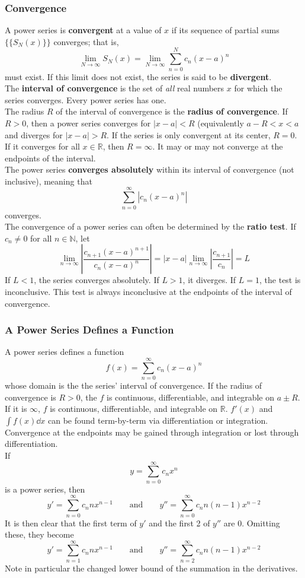 \documentclass[12pt, A4]{article}
\newcommand{\N}{\mathbb{N}}
\newcommand{\R}{\mathbb{R}}
\begin{document}
			\subsubsection{Convergence}
				A power series is \textbf{convergent} at a value of \(x\) if its sequence of partial sums \(\{\{S_N(x)\}\}\) converges; that is,
					\[\lim_{N \to \infty}S_N(x) = \lim_{N \to \infty}\sum_{n = 0}^Nc_n(x - a)^n\]
					must exist. If this limit does not exist, the series is said to be \textbf{divergent}. \\
				 The \textbf{interval of convergence} is the set of \textit{all} real numbers \(x\) for which the series converges. Every power series has one. \\
				 The radius \(R\) of the interval of convergence is the \textbf{radius of convergence}. If \(R > 0\), then a power series converges for \(|x - a| < R\) (equivalently \(a - R < x < a\)  and diverges for \(|x - a| > R\). If the series is only convergent at its center, \(R = 0\). If it converges for all \(x \in \R\), then \(R = \infty\). It may or may not converge at the endpoints of the interval. \\
				 The power series \textbf{converges absolutely} within its interval of convergence (not inclusive), meaning that
				 	\[\sum_{n = 0}^\infty\left|c_n(x - a)^n\right|\]
				 	converges. \\
				 The convergence of a power series can often be determined by the \textbf{ratio test}. If \(c_n \ne 0\) for all \(n \in \N\), let
				 	\[
				 		\lim_{n \to \infty}\left|\frac{c_{n + 1}(x - a)^{n + 1}}{c_n(x - a)^n}\right|
				 			= |x - a|\lim_{n \to \infty}\left|\frac{c_{n + 1}}{c_n}\right|
				 			= L
					\]
					If \(L < 1\), the series converges absolutely. If \(L > 1\), it diverges. If \(L = 1\), the test is inconclusive. This test is always inconclusive at the endpoints of the interval of convergence.
			\subsubsection{A Power Series Defines a Function}
				A power series defines a function
						\[f(x) = \sum_{n = 0}^\infty c_n(x - a)^n\]
						whose domain is the the series' interval of convergence. If the radius of convergence is \(R > 0\), the \(f\) is continuous, differentiable, and integrable on \(a \pm R\). If it is \(\infty\), \(f\) is continuous, differentiable, and integrable on \(\R\). \(f'(x)\) and \(\int f(x)\dd{x}\) can be found term-by-term via differentiation or integration. Convergence at the endpoints may be gained through integration or lost through differentiation. \\
					If
						\[y = \sum_{n = 0}^\infty c_nx^n\]
						is a power series, then
						\[
							y' = \sum_{n = 0}^\infty c_nnx^{n - 1} \qquad \text{and} \qquad
							y'' = \sum_{n = 0}^\infty c_nn(n - 1)x^{n - 2}
						\]
						It is then clear that the first term of \(y'\) and the first 2 of \(y''\) are 0. Omitting these, they become
						\[
							y' = \sum_{n = 1}^\infty c_nnx^{n - 1} \qquad \text{and} \qquad
							y'' = \sum_{n = 2}^\infty c_nn(n - 1)x^{n - 2}
						\]
						Note in particular the changed lower bound of the summation in the derivatives.
\end{document}
